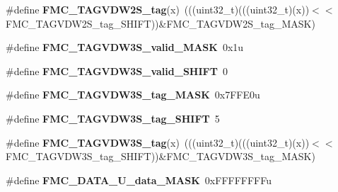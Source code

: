 \begin{DoxyCompactItemize}
\item 
\#define {\bfseries F\+M\+C\+\_\+\+T\+A\+G\+V\+D\+W2\+S\+\_\+tag}(x)~(((uint32\+\_\+t)(((uint32\+\_\+t)(x))$<$$<$F\+M\+C\+\_\+\+T\+A\+G\+V\+D\+W2\+S\+\_\+tag\+\_\+\+S\+H\+I\+FT))\&F\+M\+C\+\_\+\+T\+A\+G\+V\+D\+W2\+S\+\_\+tag\+\_\+\+M\+A\+SK)\hypertarget{group__FMC__Register__Masks_ga5bab632691e7c7f54e28b42b0898fbaf}{}\label{group__FMC__Register__Masks_ga5bab632691e7c7f54e28b42b0898fbaf}

\item 
\#define {\bfseries F\+M\+C\+\_\+\+T\+A\+G\+V\+D\+W3\+S\+\_\+valid\+\_\+\+M\+A\+SK}~0x1u\hypertarget{group__FMC__Register__Masks_ga3f4eebc3416cc79b7c513a836b8b670b}{}\label{group__FMC__Register__Masks_ga3f4eebc3416cc79b7c513a836b8b670b}

\item 
\#define {\bfseries F\+M\+C\+\_\+\+T\+A\+G\+V\+D\+W3\+S\+\_\+valid\+\_\+\+S\+H\+I\+FT}~0\hypertarget{group__FMC__Register__Masks_gae63177b0f086e164153f0b5f7240f11f}{}\label{group__FMC__Register__Masks_gae63177b0f086e164153f0b5f7240f11f}

\item 
\#define {\bfseries F\+M\+C\+\_\+\+T\+A\+G\+V\+D\+W3\+S\+\_\+tag\+\_\+\+M\+A\+SK}~0x7\+F\+F\+E0u\hypertarget{group__FMC__Register__Masks_ga541edb8adcd9202130abaea64cd8bf9a}{}\label{group__FMC__Register__Masks_ga541edb8adcd9202130abaea64cd8bf9a}

\item 
\#define {\bfseries F\+M\+C\+\_\+\+T\+A\+G\+V\+D\+W3\+S\+\_\+tag\+\_\+\+S\+H\+I\+FT}~5\hypertarget{group__FMC__Register__Masks_ga575e10b20b9366a19e6cbc839fc3353b}{}\label{group__FMC__Register__Masks_ga575e10b20b9366a19e6cbc839fc3353b}

\item 
\#define {\bfseries F\+M\+C\+\_\+\+T\+A\+G\+V\+D\+W3\+S\+\_\+tag}(x)~(((uint32\+\_\+t)(((uint32\+\_\+t)(x))$<$$<$F\+M\+C\+\_\+\+T\+A\+G\+V\+D\+W3\+S\+\_\+tag\+\_\+\+S\+H\+I\+FT))\&F\+M\+C\+\_\+\+T\+A\+G\+V\+D\+W3\+S\+\_\+tag\+\_\+\+M\+A\+SK)\hypertarget{group__FMC__Register__Masks_gab4e42df87d80871e55707c4fa55d7ac5}{}\label{group__FMC__Register__Masks_gab4e42df87d80871e55707c4fa55d7ac5}

\item 
\#define {\bfseries F\+M\+C\+\_\+\+D\+A\+T\+A\+\_\+\+U\+\_\+data\+\_\+\+M\+A\+SK}~0x\+F\+F\+F\+F\+F\+F\+F\+Fu\hypertarget{group__FMC__Register__Masks_gae43292c4f0149b2bc25d115b7f5a6ee9}{}\label{group__FMC__Register__Masks_gae43292c4f0149b2bc25d115b7f5a6ee9}


\end{DoxyCompactItemize}

